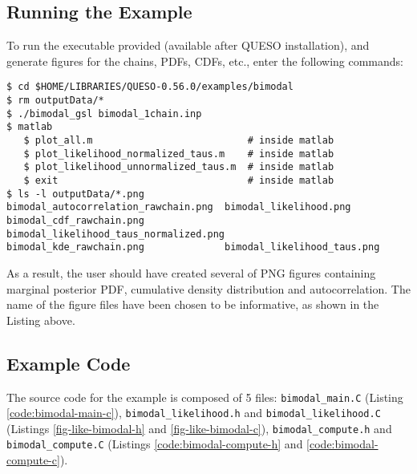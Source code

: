 \subsection{Running the Example}\label{sec:bimodal-run}

To run the executable provided (available after QUESO installation), and generate figures for the chains, PDFs, CDFs, etc., enter the following commands:
\begin{lstlisting}[label={},caption={}]
$ cd $HOME/LIBRARIES/QUESO-0.56.0/examples/bimodal
$ rm outputData/*
$ ./bimodal_gsl bimodal_1chain.inp    
$ matlab
   $ plot_all.m	                          # inside matlab
   $ plot_likelihood_normalized_taus.m    # inside matlab
   $ plot_likelihood_unnormalized_taus.m  # inside matlab
   $ exit                                 # inside matlab
$ ls -l outputData/*.png
bimodal_autocorrelation_rawchain.png  bimodal_likelihood.png
bimodal_cdf_rawchain.png	          bimodal_likelihood_taus_normalized.png
bimodal_kde_rawchain.png	          bimodal_likelihood_taus.png
\end{lstlisting}


As a result, the user should have created several of PNG figures containing marginal posterior PDF, cumulative density distribution and autocorrelation. The name of the figure files have been chosen to be informative, as shown in the Listing above.




\subsection{Example Code}\label{sec:bimodal-code}

The source code for the example is composed of 5 files:
\texttt{bimodal\_main.C} (Listing \ref{code:bimodal-main-c}), \linebreak
\texttt{bimodal\_likelihood.h} and \texttt{bimodal\_likelihood.C} (Listings \ref{fig-like-bimodal-h} and \ref{fig-like-bimodal-c}),
\texttt{bimodal\_compute.h} and \texttt{bimodal\_compute.C} (Listings \ref{code:bimodal-compute-h} and \ref{code:bimodal-compute-c}).






